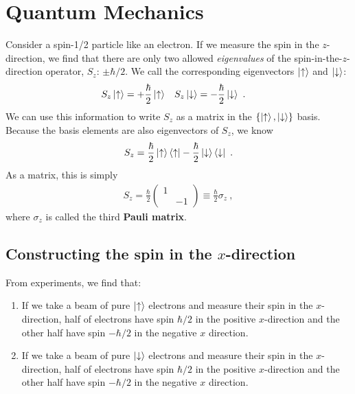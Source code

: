 \chapter{Quantum Mechanics}



Consider a spin-1/2 particle like an electron. If we measure the spin in the $z$-direction, we find that there are only two allowed \emph{eigenvalues} of the spin-in-the-$z$-direction operator, $S_z$: $\pm\hbar/2$.
We call the corresponding eigenvectors $\left|\uparrow\right\rangle$ and $\left|\downarrow\right\rangle$:
\begin{align}
    S_z\left|\uparrow\right\rangle &= + \frac{\hbar}{2}\left|\uparrow\right\rangle 
    &
    S_z\left|\downarrow\right\rangle &= - \frac{\hbar}{2}\left|\downarrow\right\rangle \ .
\end{align}
We can use this information to write $S_z$ as a matrix in the $\{\left|\uparrow\right\rangle,\left|\downarrow\right\rangle\}$ basis. Because the basis elements are also eigenvectors of $S_z$, we know
\begin{align}
    S_z = 
    \frac{\hbar}{2}\left|\uparrow\right\rangle\left\langle\uparrow\right|
    -
    \frac{\hbar}{2}\left|\downarrow\right\rangle\left\langle\downarrow\right| \ .
\end{align}
As a matrix, this is simply
\begin{align}
    S_z = \frac{\hbar}{2}
    \begin{pmatrix}
        1 & \\ & -1 
    \end{pmatrix}
    \equiv \frac{\hbar}{2} \sigma_z \ ,
\end{align}
where $\sigma_z$ is called the third \textbf{Pauli matrix}.



\section{\texorpdfstring{Constructing the spin in the $x$-direction}{Constructing the spin in the x-direction}}

From experiments, we find that: 
\begin{enumerate}
    \item If we take a beam of pure $\left|\uparrow\right\rangle$ electrons and measure their spin in the $x$-direction, half of electrons have spin $\hbar/2$ in the positive $x$-direction and the other half have spin $-\hbar/2$ in the negative $x$ direction. 
    \item If we take a beam of pure $\left|\downarrow\right\rangle$ electrons and measure their spin in the $x$-direction, half of electrons have spin $\hbar/2$ in the positive $x$-direction and the other half have spin $-\hbar/2$ in the negative $x$ direction. 
\end{enumerate}

